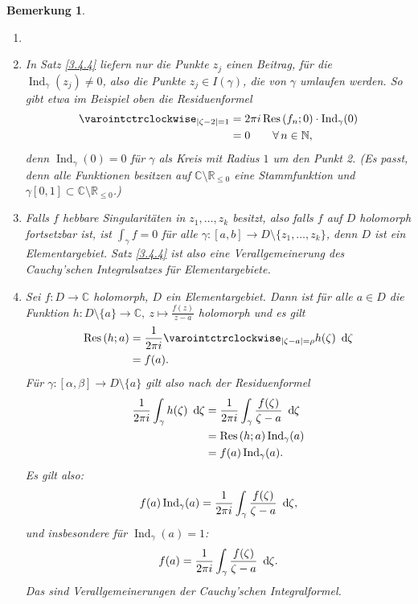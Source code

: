 \documentclass[a4paper,12pt]{article}
\theoremstyle{newthm}
\theoremstyle{newdef}
\theoremstyle{newrem}
\newtheorem*{rem}{Bemerkung}
\newcommand{\N}{\mathbb{N}}
\newcommand{\R}{\mathbb{R}}
\newcommand{\C}{\mathbb{C}}
\renewcommand{\d}{\ \operatorname{d}\hspace{-2px}}
\newcommand{\Ind}[1]{\operatorname{Ind}_{#1}}
\newcommand{\Res}[2]{\operatorname{Res} \left( #1;#2 \right) }
\begin{document}
		\begin{rem}
			\begin{enumerate}[label={\alph*})]
				\item[]
				\item In Satz \ref{3.4.4} liefern nur die Punkte $z_j$ einen Beitrag, für die $\Ind{\gamma}(z_j) \neq 0$, also die Punkte $z_j \in I(\gamma)$, die von $\gamma$ umlaufen werden. So gibt etwa im Beispiel oben die Residuenformel 
				\begin{align*}
					\varointctrclockwise_{|\zeta - 2|=1} &= 2\pi i \Res{f_n}{0} \cdot \Ind{\gamma}(0)\\
					&= 0 \qquad \forall\, n \in \N,
				\end{align*}
				denn $\Ind{\gamma}(0) = 0$ für $\gamma$ als Kreis mit Radius $1$ um den Punkt 2. (Es passt, denn alle Funktionen besitzen auf $\C \setminus\R_{\leq 0}$ eine Stammfunktion und $ \gamma[0,1] \subset \C\setminus\R_{\leq 0} $.)
				\item Falls $f$ hebbare Singularitäten in $z_1,\dotsc,z_k$ besitzt, also falls $f$ auf $D$ holomorph fortsetzbar ist, ist $\int_\gamma f = 0$ für alle $ \gamma:[a,b] \to D \setminus\{z_1,\dotsc,z_k\} $, denn $D$ ist ein Elementargebiet. Satz \ref{3.4.4} ist also eine Verallgemeinerung des Cauchy'schen Integralsatzes für Elementargebiete.
				\item Sei $ f: D \to \C $ holomorph, $D$ ein Elementargebiet. Dann ist für alle $a \in D$ die Funktion $ h: D \setminus\{a\} \to \C,\ z \mapsto \frac{f(z)}{z-a} $ holomorph und es gilt
				\begin{align*}
					\Res{h}{a} &= \frac{1}{2\pi i} \varointctrclockwise_{|\zeta - a| = \rho} h(\zeta)\d\zeta\\
					&= f(a).
				\end{align*}
				Für $ \gamma: [\alpha,\beta] \to D\setminus\{a\} $ gilt also nach der Residuenformel
				\begin{align*}
					\frac{1}{2\pi i} \int_\gamma h(\zeta)\d\zeta &= \frac{1}{2\pi i} \int_\gamma \frac{f(\zeta)}{\zeta-a} \d\zeta\\
					&= \Res{h}{a} \Ind{\gamma}(a)\\
					&= f(a) \Ind{\gamma}(a).
				\end{align*}
				Es gilt also:
				\[ f(a)\Ind{\gamma}(a) = \frac{1}{2\pi i} \int_\gamma \frac{f(\zeta)}{\zeta-a}\d\zeta, \]
				und insbesondere für $\Ind{\gamma}(a) = 1$:
				\[ f(a) = \frac{1}{2\pi i} \int_\gamma \frac{f(\zeta)}{\zeta -a}\d\zeta. \]
				Das sind Verallgemeinerungen der Cauchy'schen Integralformel.
			\end{enumerate}
		\end{rem}
		
\end{document}

